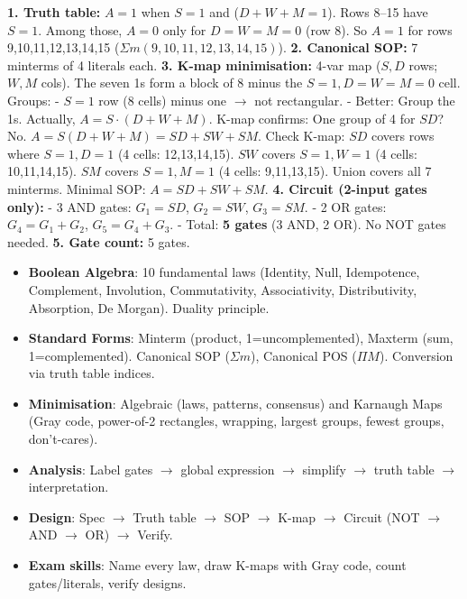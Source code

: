 \documentclass[11pt]{article}
\begin{document}
\begin{corrige}
\textbf{1. Truth table:} $A=1$ when $S=1$ and ($D+W+M=1$). Rows 8--15 have $S=1$. Among those, $A=0$ only for $D=W=M=0$ (row 8). So $A=1$ for rows 9,10,11,12,13,14,15 ($\Sigma m(9,10,11,12,13,14,15)$).
\textbf{2. Canonical SOP:} 7 minterms of 4 literals each.
\textbf{3. K-map minimisation:} 4-var map ($S,D$ rows; $W,M$ cols). The seven 1s form a block of 8 minus the $S=1,D=W=M=0$ cell.
Groups:
- $S=1$ row (8 cells) minus one $\to$ not rectangular.
- Better: Group the 1s.
  Actually, $A = S \cdot (D+W+M)$.
  K-map confirms: One group of 4 for $SD$? No.
  $A = S(D+W+M) = SD + SW + SM$.
  Check K-map: $SD$ covers rows where $S=1,D=1$ (4 cells: 12,13,14,15).
  $SW$ covers $S=1,W=1$ (4 cells: 10,11,14,15).
  $SM$ covers $S=1,M=1$ (4 cells: 9,11,13,15).
  Union covers all 7 minterms. Minimal SOP: $A = SD + SW + SM$.
\textbf{4. Circuit (2-input gates only):}
  - 3 AND gates: $G_1=SD$, $G_2=SW$, $G_3=SM$.
  - 2 OR gates: $G_4=G_1+G_2$, $G_5=G_4+G_3$.
  - Total: \textbf{5 gates} (3 AND, 2 OR). No NOT gates needed.
\textbf{5. Gate count:} 5 gates.
\end{corrige}

\begin{aretenir}
\begin{itemize}
\item \textbf{Boolean Algebra}: 10 fundamental laws (Identity, Null, Idempotence, Complement, Involution, Commutativity, Associativity, Distributivity, Absorption, De Morgan). Duality principle.
\item \textbf{Standard Forms}: Minterm (product, 1=uncomplemented), Maxterm (sum, 1=complemented). Canonical SOP ($\Sigma m$), Canonical POS ($\Pi M$). Conversion via truth table indices.
\item \textbf{Minimisation}: Algebraic (laws, patterns, consensus) and Karnaugh Maps (Gray code, power-of-2 rectangles, wrapping, largest groups, fewest groups, don't-cares).
\item \textbf{Analysis}: Label gates $\to$ global expression $\to$ simplify $\to$ truth table $\to$ interpretation.
\item \textbf{Design}: Spec $\to$ Truth table $\to$ SOP $\to$ K-map $\to$ Circuit (NOT $\to$ AND $\to$ OR) $\to$ Verify.
\item \textbf{Exam skills}: Name every law, draw K-maps with Gray code, count gates/literals, verify designs.
\end{itemize}
\end{aretenir}
\end{document}

